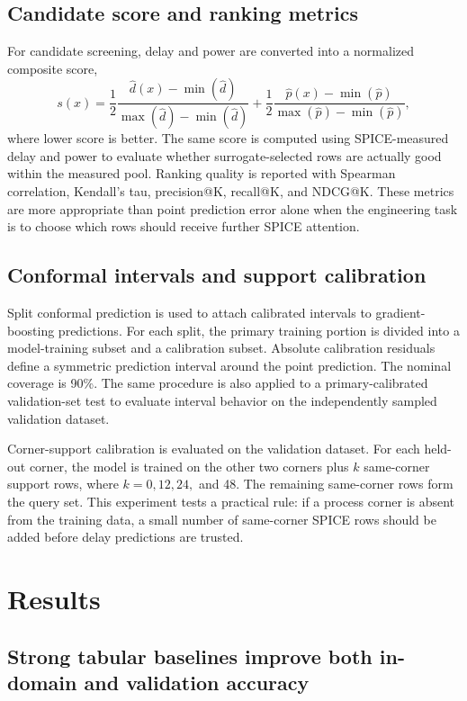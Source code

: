 \documentclass[preprint,12pt]{elsarticle}
\begin{document}
\subsection{Candidate score and ranking metrics}

For candidate screening, delay and power are converted into a normalized composite score,
\begin{equation}
s(x)=\frac{1}{2}\frac{\hat{d}(x)-\min(\hat{d})}{\max(\hat{d})-\min(\hat{d})}
    +\frac{1}{2}\frac{\hat{p}(x)-\min(\hat{p})}{\max(\hat{p})-\min(\hat{p})},
\end{equation}
where lower score is better. The same score is computed using SPICE-measured delay and power to evaluate whether surrogate-selected rows are actually good within the measured pool. Ranking quality is reported with Spearman correlation, Kendall's tau, precision@K, recall@K, and NDCG@K. These metrics are more appropriate than point prediction error alone when the engineering task is to choose which rows should receive further SPICE attention.

\subsection{Conformal intervals and support calibration}

Split conformal prediction is used to attach calibrated intervals to gradient-boosting predictions. For each split, the primary training portion is divided into a model-training subset and a calibration subset. Absolute calibration residuals define a symmetric prediction interval around the point prediction. The nominal coverage is 90\%. The same procedure is also applied to a primary-calibrated validation-set test to evaluate interval behavior on the independently sampled validation dataset.

Corner-support calibration is evaluated on the validation dataset. For each held-out corner, the model is trained on the other two corners plus $k$ same-corner support rows, where $k=0,12,24,$ and 48. The remaining same-corner rows form the query set. This experiment tests a practical rule: if a process corner is absent from the training data, a small number of same-corner SPICE rows should be added before delay predictions are trusted.

\section{Results}

\subsection{Strong tabular baselines improve both in-domain and validation accuracy}
\end{document}
